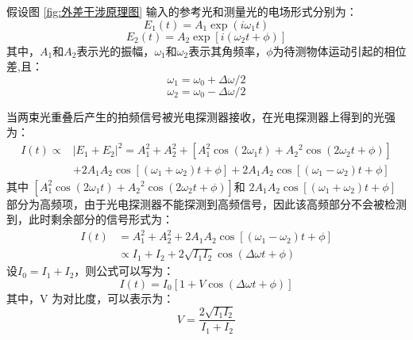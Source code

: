 \documentclass[type=master,oneside]{fduthesis}
\begin{document}
假设图 \ref{fig:外差干涉原理图} 输入的参考光和测量光的电场形式分别为：
\begin{equation}
  E_{1}(t)=A_{1} \exp \left(i \omega_{1} t\right)
\end{equation}
\begin{equation}
  E_{2}(t)=A_{2} \exp \left[i\left(\omega_{2} t+\phi\right)\right]
\end{equation}
其中，$ A_{1}$和$ A_{2}$表示光的振幅，$\omega_{1}$和$\omega_{2}$表示其角频率，$\phi $为待测物体运动引起的相位差,且：
\begin{equation}
  \omega_{1}=\omega_{0}+\Delta \omega / 2
\end{equation}
\begin{equation}
  \omega_{2}=\omega_{0}-\Delta \omega / 2
\end{equation}

当两束光重叠后产生的拍频信号被光电探测器接收，在光电探测器上得到的光强为：
\begin{equation}
  \begin{aligned}
    I(t)\propto & \left|E_{1}+E_{2}\right|^{2}= A_{1}^{2}+ A_{2}^{2}+\left[A_{1}^{2} \cos \left(2 \omega_{1} t\right)+A_{2}{ }^{2} \cos \left(2 \omega_{2} t+\phi\right)\right] \\
                & +2A_{1} A_{2} \cos \left[\left(\omega_{1}+\omega_{2}\right) t+\phi\right]+ 2A_{1} A_{2} \cos \left[\left(\omega_{1}-\omega_{2}\right) t+\phi\right]
  \end{aligned}
\end{equation}
其中 $\left[A_{1}^{2} \cos \left(2 \omega_{1} t\right)+A_{2}{ }^{2} \cos \left(2 \omega_{2} t+\phi\right)\right] $和 $2A_{1} A_{2} \cos \left[\left(\omega_{1}+\omega_{2}\right) t+\phi\right] $ 部分为高频项，由于光电探测器不能探测到高频信号，因此该高频部分不会被检测到，此时剩余部分的信号形式为：
\begin{equation}
  \begin{aligned}
    I(t) & =A_{1}^{2}+A_{2}^{2}+2A_{1} A_{2} \cos \left[\left(\omega_{1}-\omega_{2}\right) t+\phi\right] \\
         & \propto I_{1}+I_{2}+2 \sqrt{I_{1} I_{2}} \cos (\Delta \omega t+\phi)
  \end{aligned}
\end{equation}
设$I_{0}=I_{1}+I_{2}$，则公式可以写为：
\begin{equation}
  I(t)=I_{0}[1+V \cos (\Delta \omega t+\phi)]
\end{equation}
其中，V 为对比度，可以表示为：
\begin{equation}
  V=\frac{2 \sqrt{I_{1} I_{2}}}{I_{1}+I_{2}}
\end{equation}
\end{document}
